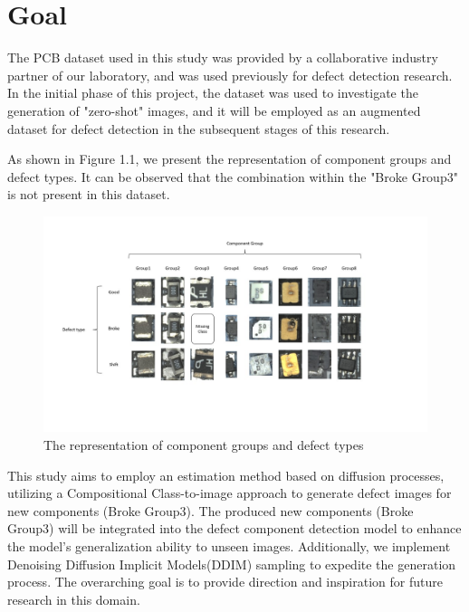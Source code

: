 \section{Goal}
The PCB dataset used in this study was provided by a collaborative industry partner of our laboratory, and was used previously for defect detection research. In the initial phase of this project, the dataset was used to investigate the generation of "zero-shot" images, and it will be employed as an augmented dataset for defect detection in the subsequent stages of this research.

As shown in Figure 1.1, we present the representation of component groups and defect types. It can be observed that the combination within the "Broke Group3" is not present in this dataset.
\begin{figure}[H]
    \centering
    \includegraphics[width=1\linewidth]{Goal.jpg}
    \caption{The representation of component groups and defect types }
    \label{fig:enter-label}
\end{figure}

This study aims to employ an estimation method based on diffusion processes, utilizing a Compositional Class-to-image approach to generate defect images for new components (Broke Group3). The produced new components (Broke Group3) will be integrated into the defect component detection model to enhance the model's generalization ability to unseen images. Additionally, we implement Denoising Diffusion Implicit Models(DDIM)\cite{DDIM} sampling to expedite the generation process. The overarching goal is to provide direction and inspiration for future research in this domain.


